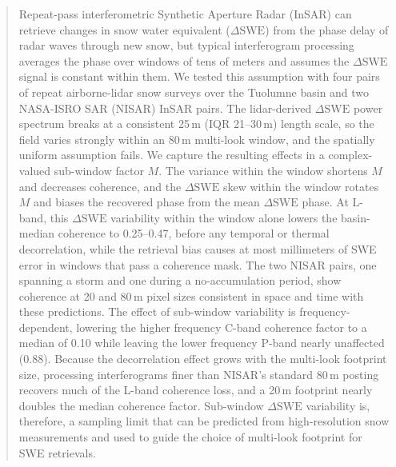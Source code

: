 \documentclass[tc, manuscript]{copernicus}
\begin{document}
\begin{abstract}
Repeat-pass interferometric Synthetic Aperture Radar (InSAR) can retrieve changes in snow water equivalent ($\Delta\mathrm{SWE}$) from the phase delay of radar waves through new snow, but typical interferogram processing averages the phase over windows of tens of meters and assumes the $\Delta\mathrm{SWE}$ signal is constant within them. We tested this assumption with four pairs of repeat airborne-lidar snow surveys over the Tuolumne basin and two NASA-ISRO SAR (NISAR) InSAR pairs. The lidar-derived $\Delta\mathrm{SWE}$ power spectrum breaks at a consistent 25\,\unit{m} (IQR 21--30\,\unit{m}) length scale, so the field varies strongly within an 80\,\unit{m} multi-look window, and the spatially uniform assumption fails. We capture the resulting effects in a complex-valued sub-window factor $M$. The variance within the window shortens $M$ and decreases coherence, and the $\Delta\mathrm{SWE}$ skew within the window rotates $M$ and biases the recovered phase from the mean $\Delta\mathrm{SWE}$ phase. At L-band, this $\Delta\mathrm{SWE}$ variability within the window alone lowers the basin-median coherence to 0.25--0.47, before any temporal or thermal decorrelation, while the retrieval bias causes at most millimeters of SWE error in windows that pass a coherence mask. The two NISAR pairs, one spanning a storm and one during a no-accumulation period, show coherence at 20 and 80\,\unit{m} pixel sizes consistent in space and time with these predictions. The effect of sub-window variability is frequency-dependent, lowering the higher frequency C-band coherence factor to a median of 0.10 while leaving the lower frequency P-band nearly unaffected (0.88). Because the decorrelation effect grows with the multi-look footprint size, processing interferograms finer than NISAR's standard 80\,\unit{m} posting recovers much of the L-band coherence loss, and a 20\,\unit{m} footprint nearly doubles the median coherence factor. Sub-window $\Delta\mathrm{SWE}$ variability is, therefore, a sampling limit that can be predicted from high-resolution snow measurements and used to guide the choice of multi-look footprint for SWE retrievals.
\end{abstract}


\end{document}
